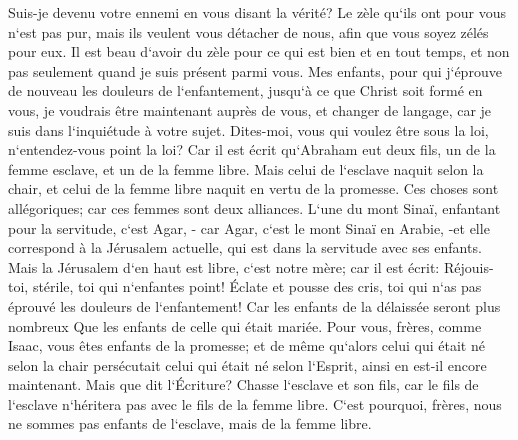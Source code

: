 \verse Suis-je devenu votre ennemi en vous disant la vérité? 
\verse Le zèle qu`ils ont pour vous n`est pas pur, mais ils veulent vous détacher de nous, afin que vous soyez zélés pour eux. 
\verse Il est beau d`avoir du zèle pour ce qui est bien et en tout temps, et non pas seulement quand je suis présent parmi vous. 
\verse Mes enfants, pour qui j`éprouve de nouveau les douleurs de l`enfantement, jusqu`à ce que Christ soit formé en vous, 
\verse je voudrais être maintenant auprès de vous, et changer de langage, car je suis dans l`inquiétude à votre sujet. 
\verse Dites-moi, vous qui voulez être sous la loi, n`entendez-vous point la loi? 
\verse Car il est écrit qu`Abraham eut deux fils, un de la femme esclave, et un de la femme libre. 
\verse Mais celui de l`esclave naquit selon la chair, et celui de la femme libre naquit en vertu de la promesse. 
\verse Ces choses sont allégoriques; car ces femmes sont deux alliances. L`une du mont Sinaï, enfantant pour la servitude, c`est Agar, - 
\verse car Agar, c`est le mont Sinaï en Arabie, -et elle correspond à la Jérusalem actuelle, qui est dans la servitude avec ses enfants. 
\verse Mais la Jérusalem d`en haut est libre, c`est notre mère; 
\verse car il est écrit: Réjouis-toi, stérile, toi qui n`enfantes point! Éclate et pousse des cris, toi qui n`as pas éprouvé les douleurs de l`enfantement! Car les enfants de la délaissée seront plus nombreux Que les enfants de celle qui était mariée. 
\verse Pour vous, frères, comme Isaac, vous êtes enfants de la promesse; 
\verse et de même qu`alors celui qui était né selon la chair persécutait celui qui était né selon l`Esprit, ainsi en est-il encore maintenant. 
\verse Mais que dit l`Écriture? Chasse l`esclave et son fils, car le fils de l`esclave n`héritera pas avec le fils de la femme libre. 
\verse C`est pourquoi, frères, nous ne sommes pas enfants de l`esclave, mais de la femme libre. 

